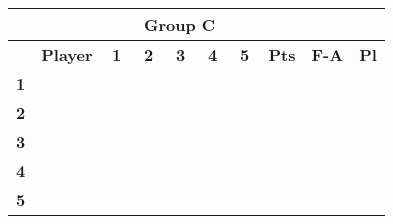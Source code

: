 \documentclass[10pt]{article}
\newcommand{\red}{\color{red}}
\newcommand{\blue}{\color{blue}}
\newcommand{\blank}{\cellcolor[gray]{.5}}
\begin{document}
\hspace{-1.5cm}
\begin{tabular}{|c|p{2.8cm}|c|c|c|c|c|c|c|c|}
	\multicolumn{9}{c}{\bf Group C} \\ \hline
	& \bf Player & \bf1 & \bf2 & \bf3 & \bf4 & \bf5 & \bf Pts & \bf F-A & \bf Pl \\ \hline
	\multirow{2}{*}{\bf1}&\multirow{2}{*}{}      & \blank$\quad$ & \red$\quad$ & \red$\quad$ & \red$\quad$ & \red$\quad$ &\multirow{2}{*}{}&\multirow{2}{*}{}&\multirow{2}{*}{} \\ && \blank & \red & \blue & \red & \red &&& \\ \hline
	\multirow{2}{*}{\bf2}&\multirow{2}{*}{\it}     & \blue & \blank & \red & \red & \red &\multirow{2}{*}{}&\multirow{2}{*}{}&\multirow{2}{*}{} \\      && \blue & \blank &  & \red & \red &&& \\ \hline
	\multirow{2}{*}{\bf3}&\multirow{2}{*}{\it}     & \blue & \blue & \blank & \red & \red &\multirow{2}{*}{}&\multirow{2}{*}{}&\multirow{2}{*}{} \\     && \red &  & \blank & \blue & \red &&& \\ \hline
	\multirow{2}{*}{\bf4}&\multirow{2}{*}{\it}     & \blue & \blue & \blue & \blank & \red &\multirow{2}{*}{}&\multirow{2}{*}{}&\multirow{2}{*}{} \\     && \blue & \blue & \red & \blank & \red &&& \\ \hline
	\multirow{2}{*}{\bf5}&\multirow{2}{*}{\it}     & \blue & \blue & \blue & \red & \blank &\multirow{2}{*}{}&\multirow{2}{*}{}&\multirow{2}{*}{} \\     && \blue & \blue & \red & \red & \blank &&& \\ \hline
\end{tabular}
\hspace{0.2cm}
\end{document}
